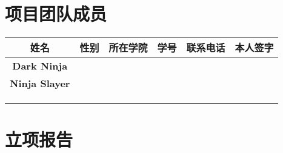 \documentclass[12pt]{article}
\begin{document}
\section{ 项目团队成员 }
\begin{table}[h]
	\centering
	\begin{adjustbox}{width=1\textwidth}
		\begin{tabular}{|c|c|c|c|c|c|}
			\hline
			\textbf{姓名}         & \textbf{性别} & \textbf{所在学院} & \textbf{学号} & \textbf{联系电话} & \textbf{本人签字} \\ \hline
			\textbf{Dark Ninja}   & \textbf{}     & \textbf{}         & \textbf{}     & \textbf{}         & \textbf{}         \\ \hline
			\textbf{Ninja Slayer} & \textbf{}     & \textbf{}         & \textbf{}     & \textbf{}         & \textbf{}         \\ \hline
			\textbf{}             & \textbf{}     & \textbf{}         & \textbf{}     & \textbf{}         & \textbf{}         \\ \hline
			\textbf{}             & \textbf{}     & \textbf{}         & \textbf{}     & \textbf{}         & \textbf{}         \\ \hline
			\textbf{}             & \textbf{}     & \textbf{}         & \textbf{}     & \textbf{}         & \textbf{}         \\ \hline
		\end{tabular}
	\end{adjustbox}
\end{table}

\section{ 立项报告 }
\end{document}
